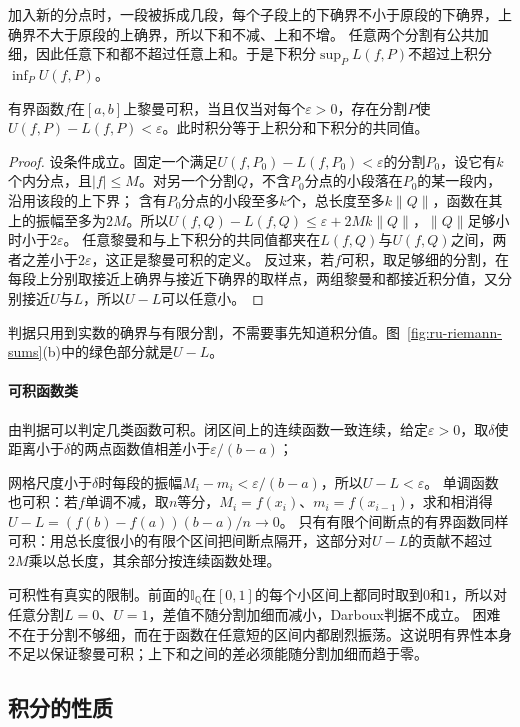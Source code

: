 加入新的分点时，一段被拆成几段，每个子段上的下确界不小于原段的下确界，上确界不大于原段的上确界，所以下和不减、上和不增。
任意两个分割有公共加细，因此任意下和都不超过任意上和。于是下积分$\sup_PL(f,P)$不超过上积分$\inf_PU(f,P)$。
\begin{theorem}[Darboux判据]
\label{thm:ru-darboux-criterion}
有界函数$f$在$[a,b]$上黎曼可积，当且仅当对每个$\varepsilon>0$，存在分割$P$使$U(f,P)-L(f,P)<\varepsilon$。此时积分等于上积分和下积分的共同值。
\end{theorem}
\begin{proof}
设条件成立。固定一个满足$U(f,P_0)-L(f,P_0)<\varepsilon$的分割$P_0$，设它有$k$个内分点，且$|f|\leq M$。对另一个分割$Q$，不含$P_0$分点的小段落在$P_0$的某一段内，沿用该段的上下界；
含有$P_0$分点的小段至多$k$个，总长度至多$k\|Q\|$，函数在其上的振幅至多为$2M$。所以$U(f,Q)-L(f,Q)\leq\varepsilon+2Mk\|Q\|$，$\|Q\|$足够小时小于$2\varepsilon$。
任意黎曼和与上下积分的共同值都夹在$L(f,Q)$与$U(f,Q)$之间，两者之差小于$2\varepsilon$，这正是黎曼可积的定义。
反过来，若$f$可积，取足够细的分割，在每段上分别取接近上确界与接近下确界的取样点，两组黎曼和都接近积分值，又分别接近$U$与$L$，所以$U-L$可以任意小。
\end{proof}
判据只用到实数的确界与有限分割，不需要事先知道积分值。图~\ref{fig:ru-riemann-sums}(b)中的绿色部分就是$U-L$。

\paragraph{可积函数类}
由判据可以判定几类函数可积。闭区间上的连续函数一致连续，给定$\varepsilon>0$，取$\delta$使距离小于$\delta$的两点函数值相差小于$\varepsilon/(b-a)$；

网格尺度小于$\delta$时每段的振幅$M_i-m_i<\varepsilon/(b-a)$，所以$U-L<\varepsilon$。
单调函数也可积：若$f$单调不减，取$n$等分，$M_i=f(x_i)$、$m_i=f(x_{i-1})$，求和相消得$U-L=(f(b)-f(a))(b-a)/n\to0$。
只有有限个间断点的有界函数同样可积：用总长度很小的有限个区间把间断点隔开，这部分对$U-L$的贡献不超过$2M$乘以总长度，其余部分按连续函数处理。

可积性有真实的限制。前面的$\mathbb I_{\mathbb Q}$在$[0,1]$的每个小区间上都同时取到$0$和$1$，所以对任意分割$L=0$、$U=1$，差值不随分割加细而减小，Darboux判据不成立。
困难不在于分割不够细，而在于函数在任意短的区间内都剧烈振荡。这说明有界性本身不足以保证黎曼可积；上下和之间的差必须能随分割加细而趋于零。

\subsection{积分的性质}
\label{sec:ru-integral-properties}

